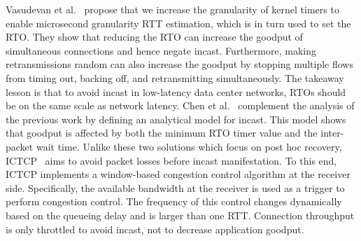 \documentclass[a4paper,12pt,twoside,openright]{report}
\begin{document}
Vasudevan et al.~\cite{Vasudevan:2009:SEF} propose that we increase the
granularity of kernel timers to enable microsecond granularity RTT estimation,
which is in turn used to set the RTO. They show that reducing the RTO can
increase the goodput of simultaneous connections and hence negate incast.
Furthermore, making retransmissions random can also increase the goodput by
stopping multiple flows from timing out, backing off, and retransmitting
simultaneously. The takeaway lesson is that to avoid incast in low-latency data
center networks, RTOs should be on the same scale as network latency. Chen et
al.~\cite{Chen:2009:UTI} complement the analysis of the previous work by
defining an analytical model for incast. This model shows that goodput is
affected by both the minimum RTO timer value and the inter-packet wait time.
Unlike these two solutions which focus on post hoc recovery,
ICTCP~\cite{Wu:2010:IIC} aims to avoid packet losses before incast
manifestation. To this end, ICTCP implements a window-based congestion control
algorithm at the receiver side. Specifically, the available bandwidth at the
receiver is used as a trigger to perform congestion control. The frequency of
this control changes dynamically based on the queueing delay and is larger than
one RTT. Connection throughput is only throttled to avoid incast, not to
decrease application goodput. 
\end{document}
